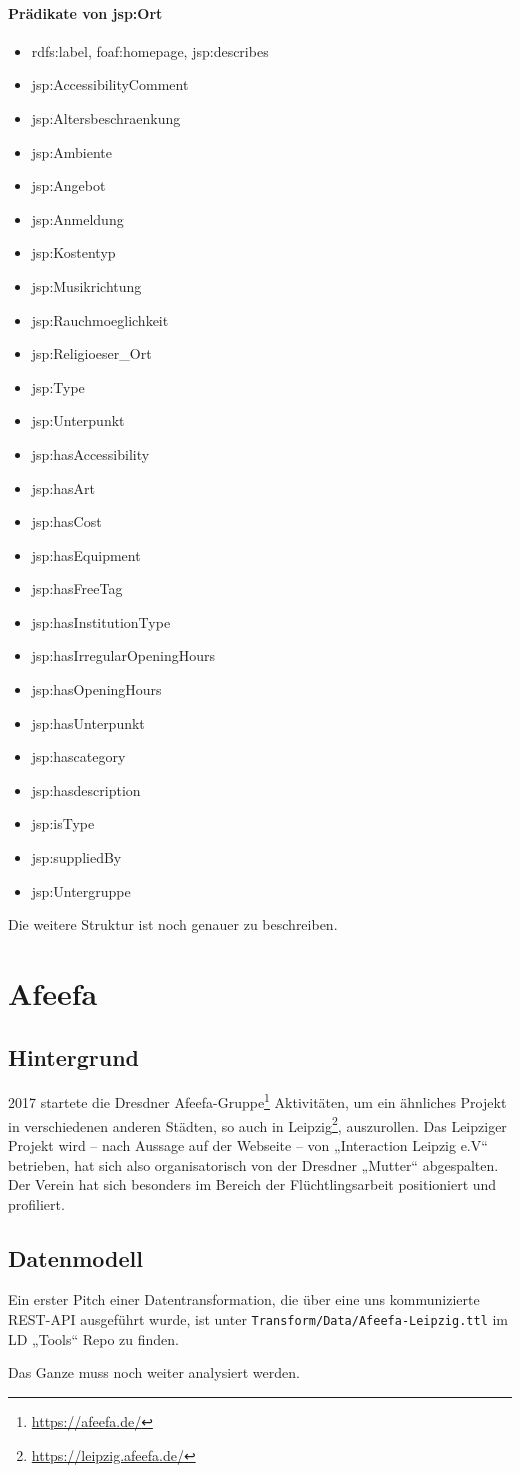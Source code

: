 \documentclass[a4paper,11pt]{article}
\begin{document}
\paragraph{Prädikate von jsp:Ort}
\begin{itemize}
\item rdfs:label, foaf:homepage, jsp:describes
\item jsp:AccessibilityComment
\item jsp:Altersbeschraenkung
\item jsp:Ambiente
\item jsp:Angebot
\item jsp:Anmeldung
\item jsp:Kostentyp
\item jsp:Musikrichtung
\item jsp:Rauchmoeglichkeit
\item jsp:Religioeser\_Ort
\item jsp:Type
\item jsp:Unterpunkt
\item jsp:hasAccessibility
\item jsp:hasArt
\item jsp:hasCost
\item jsp:hasEquipment
\item jsp:hasFreeTag
\item jsp:hasInstitutionType
\item jsp:hasIrregularOpeningHours
\item jsp:hasOpeningHours
\item jsp:hasUnterpunkt
\item jsp:hascategory
\item jsp:hasdescription
\item jsp:isType
\item jsp:suppliedBy
\item jsp:Untergruppe
\end{itemize}

Die weitere Struktur ist noch genauer zu beschreiben. 
\newpage

\section{Afeefa}

\subsection{Hintergrund}
2017 startete die Dresdner Afeefa-Gruppe\footnote{\url{https://afeefa.de/}}
Aktivitäten, um ein ähnliches Projekt in verschiedenen anderen Städten, so auch
in Leipzig\footnote{\url{https://leipzig.afeefa.de/}}, auszurollen.  Das
Leipziger Projekt wird -- nach Aussage auf der Webseite -- von „Interaction
Leipzig e.V“ betrieben, hat sich also organisatorisch von der Dresdner „Mutter“
abgespalten. Der Verein hat sich besonders im Bereich der Flüchtlingsarbeit
positioniert und profiliert. 

\subsection{Datenmodell}
Ein erster Pitch einer Datentransformation, die über eine uns kommunizierte
REST-API ausgeführt wurde, ist unter \texttt{Transform/Data/Afeefa-Leipzig.ttl}
im LD „Tools“ Repo zu finden.

Das Ganze muss noch weiter analysiert werden. 
\end{document}
